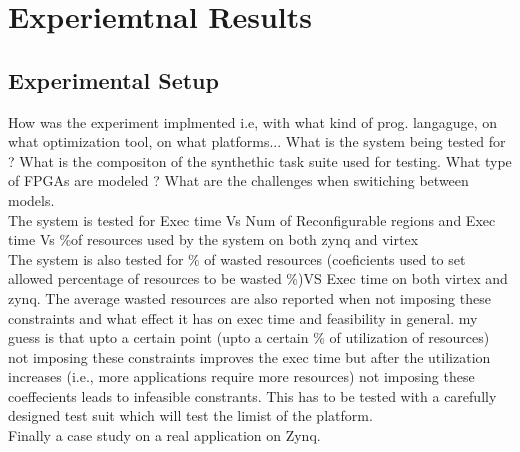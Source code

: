 \section{Experiemtnal Results}
\subsection{Experimental Setup}
How was the experiment implmented i.e, with what kind of prog. langaguge, on what optimization tool, on what platforms...
What is the system being tested for ? What is the compositon of the synthethic task suite used for testing. What type of FPGAs are modeled ?  What are the challenges when switiching between models.  \\


The system is tested for Exec time Vs Num of Reconfigurable regions and Exec time Vs \%of resources used by the system on both zynq and virtex\\

The system is also tested for \% of wasted resources (coeficients used to set allowed percentage of resources to be wasted \%)VS Exec time on both virtex and zynq. The average wasted resources are also reported when not imposing these constraints and what effect it has on exec time and feasibility in general. my guess is that upto a certain point (upto a certain \% of utilization of resources) not imposing these constraints improves the exec time but after the utilization increases (i.e., more applications require more resources) not imposing these coeffecients leads to infeasible constrants. This has to be tested with a carefully designed test suit which will test the limist of the platform. \\

Finally a case study on a real application on Zynq. 
